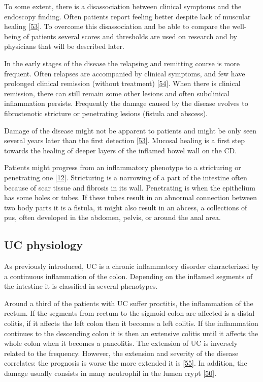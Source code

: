 \documentclass[
  12pt,
  a4paper,
  twoside,
  openright]{book}
\begin{document}
To some extent, there is a disassociation between clinical symptoms and the endoscopy finding.
Often patients report feeling better despite lack of muscular healing {[}\protect\hyperlink{ref-bhattacharya2016}{53}{]}.
To overcome this disassociation and be able to compare the well-being of patients several scores and thresholds are used on research and by physicians that will be described later.

In the early stages of the disease the relapsing and remitting course is more frequent.
Often relapses are accompanied by clinical symptoms, and few have prolonged clinical remission (without treatment) {[}\protect\hyperlink{ref-peyrin-biroulet2010}{54}{]}.
When there is clinical remission, there can still remain some other lesions and often subclinical inflammation persists.
Frequently the damage caused by the disease evolves to fibrostenotic stricture or penetrating lesions (fistula and abscess).

Damage of the disease might not be apparent to patients and might be only seen several years later than the first detection {[}\protect\hyperlink{ref-bhattacharya2016}{53}{]}.
Mucosal healing is a first step towards the healing of deeper layers of the inflamed bowel wall on the CD.

Patients might progress from an inflammatory phenotype to a stricturing or penetrating one {[}\protect\hyperlink{ref-satsangi2006}{12}{]}.
Stricturing is a narrowing of a part of the intestine often because of scar tissue and fibrosis in its wall.
Penetrating is when the epithelium has some holes or tubes.
If these tubes result in an abnormal connection between two body parts it is a fistula, it might also result in an abcess, a collections of pus, often developed in the abdomen, pelvis, or around the anal area.

\hypertarget{UC}{%
\subsection{UC physiology}\label{UC}}

As previously introduced, UC is a chronic inflammatory disorder characterized by a continuous inflammation of the colon.
Depending on the inflamed segments of the intestine it is classified in several phenotypes.

Around a third of the patients with UC suffer proctitis, the inflammation of the rectum.
If the segments from rectum to the sigmoid colon are affected is a distal colitis, if it affects the left colon then it becomes a left colitis.
If the inflammation continues to the descending colon it is then an extensive colitis until it affects the whole colon when it becomes a pancolitis.
The extension of UC is inversely related to the frequency.
However, the extension and severity of the disease correlates: the prognosis is worse the more extended it is {[}\protect\hyperlink{ref-etchevers2009}{55}{]}.
In addition, the damage usually consists in many neutrophil in the lumen crypt {[}\protect\hyperlink{ref-bassolasmolina2018}{50}{]}.
\end{document}
